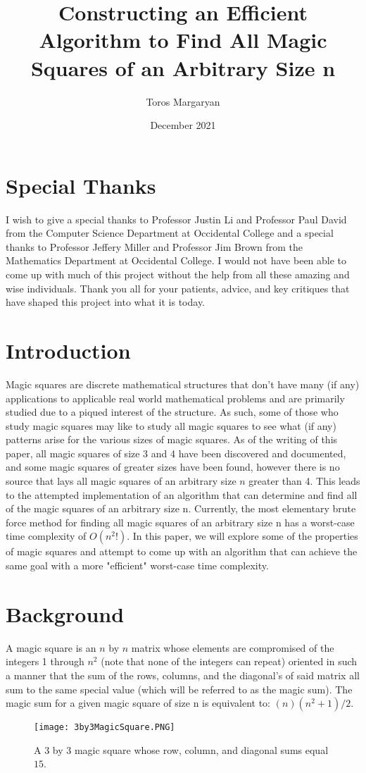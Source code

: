 \documentclass{article}
\title{Constructing an Efficient Algorithm to Find All Magic Squares of an Arbitrary Size n}
\author{Toros Margaryan}
\affil{Department of Computer Science, Occidental College}
\date{December 2021}
\begin{document}
\maketitle

\section{Special Thanks}
    I wish to give a special thanks to Professor Justin Li and Professor Paul David from the Computer Science Department at Occidental College and a special thanks to Professor Jeffery Miller and Professor Jim Brown from the Mathematics Department at Occidental College. I would not have been able to come up with much of this project without the help from all these amazing and wise individuals. Thank you all for your patients, advice, and key critiques that have shaped this project into what it is today.   
\section{Introduction}
    Magic squares are discrete mathematical structures that don't have many (if any) applications to applicable real world mathematical problems and are primarily studied due to a piqued interest of the structure. As such, some of those who study magic squares may like to study all magic squares to see what (if any) patterns arise for the various sizes of magic squares. As of the writing of this paper, all magic squares of size 3 and 4 have been discovered and documented, and some magic squares of greater sizes have been found, however there is no source that lays all magic squares of an arbitrary size $n$ greater than 4. This leads to the attempted implementation of an algorithm that can determine and find all of the magic squares of an arbitrary size n. Currently, the most elementary brute force method for finding all magic squares of an arbitrary size n has a worst-case time complexity of $O(n^2!)$. In this paper, we will explore some of the properties of magic squares and attempt to come up with an algorithm that can achieve the same goal with a more "efficient" worst-case time complexity.     
\section{Background}

    A magic square is an $n$ by $n$ matrix whose elements are compromised of the integers 1 through $n^{2}$ (note that none of the integers can repeat) oriented in such a manner that  
    the sum of the rows, columns, and the diagonal's of said matrix all sum to the same special value (which will be referred to as the magic
    sum). The magic sum for a given magic square of size n is equivalent to: $(n)(n^2 + 1)/2$.
    \begin{figure}[h!]
        \begin{center}
            \texttt{[image: 3by3MagicSquare.PNG]}\\
            \caption{A 3 by 3 magic square whose row, column, and diagonal sums equal $15$.}\label{}
        \end{center}
    \end{figure}
    
\end{document}
